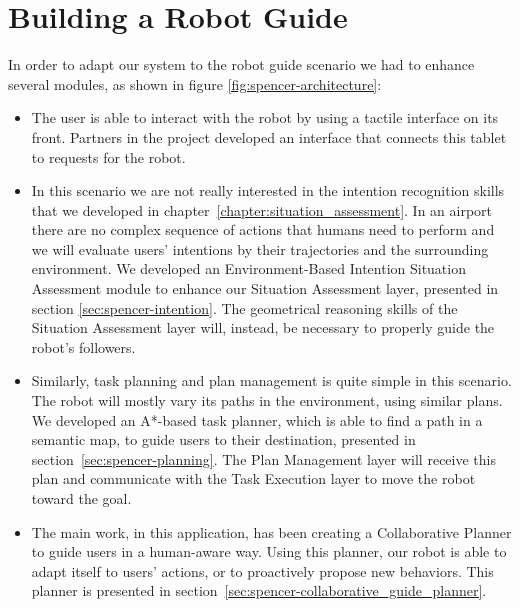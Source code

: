 \section{Building a Robot Guide}
\label{sec:spencer-robot_guide}
In order to adapt our system to the robot guide scenario we had to enhance several modules, as shown in figure \ref{fig:spencer-architecture}: 
\begin{itemize}
\item The user is able to interact with the robot by using a tactile interface on its front. Partners in the project developed an interface that connects this tablet to requests for the robot.
\item In this scenario we are not really interested in the intention recognition skills that we developed in chapter~\ref{chapter:situation_assessment}. In an airport there are no complex sequence of actions that humans need to perform and we will evaluate users' intentions by their trajectories and the surrounding environment. We developed an Environment-Based Intention Situation Assessment module to enhance our Situation Assessment layer, presented in section \ref{sec:spencer-intention}. The geometrical reasoning skills of the Situation Assessment layer will, instead, be necessary to properly guide the robot's followers. 
\item Similarly, task planning and plan management is quite simple in this scenario. The robot will mostly vary its paths in the environment, using similar plans. We developed an A*-based task planner, which is able to find a path in a semantic map, to guide users to their destination, presented in section~\ref{sec:spencer-planning}. The Plan Management layer will receive this plan and communicate with the Task Execution layer to move the robot toward the goal.
\item The main work, in this application, has been creating a Collaborative Planner to guide users in a human-aware way. Using this planner, our robot is able to adapt itself to users' actions, or to proactively propose new behaviors. This planner is presented in section~\ref{sec:spencer-collaborative_guide_planner}.
\end{itemize} 

